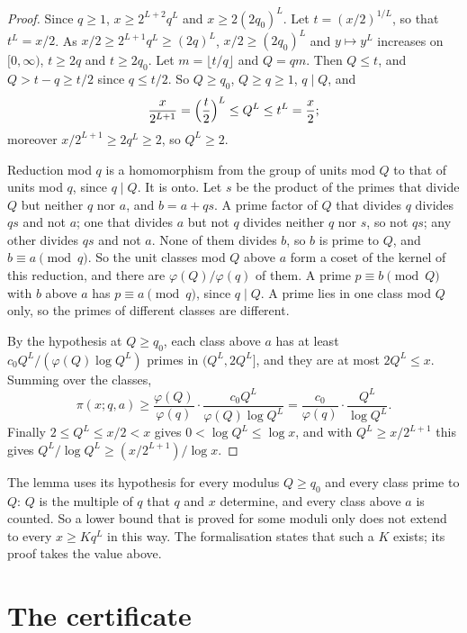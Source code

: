 \documentclass[11pt]{article}
\theoremstyle{definition}
\begin{document}
\begin{proof}
Since $q \ge 1$, $x \ge 2^{L + 2} q^L$ and $x \ge 2(2q_0)^L$. Let $t = (x/2)^{1/L}$, so that $t^L = x/2$. As $x/2
\ge 2^{L + 1} q^L \ge (2q)^L$, $x/2 \ge (2q_0)^L$ and $y \mapsto y^L$ increases on $[0, \infty)$, $t \ge 2q$ and $t
\ge 2q_0$. Let $m = \lfloor t/q \rfloor$ and $Q = qm$. Then $Q \le t$, and $Q > t - q \ge t/2$ since $q \le t/2$. So
$Q \ge q_0$, $Q \ge q \ge 1$, $q \mid Q$, and
\[
  \frac x{2^{L + 1}} = \Bigl(\frac t2\Bigr)^L \le Q^L \le t^L = \frac x2;
\]
moreover $x/2^{L + 1} \ge 2q^L \ge 2$, so $Q^L \ge 2$.

Reduction mod $q$ is a homomorphism from the group of units mod $Q$ to that of units mod $q$, since $q \mid Q$. It is
onto. Let $s$ be the product of the primes that divide $Q$ but neither $q$ nor $a$, and $b = a + qs$. A prime factor
of $Q$ that divides $q$ divides $qs$ and not $a$; one that divides $a$ but not $q$ divides neither $q$ nor $s$, so
not $qs$; any other divides $qs$ and not $a$. None of them divides $b$, so $b$ is prime to $Q$, and $b \equiv a
\pmod q$. So the unit classes mod $Q$ above $a$ form a coset of the kernel of this reduction, and there are
$\varphi(Q)/\varphi(q)$ of them. A prime $p \equiv b \pmod Q$ with $b$ above $a$ has $p \equiv a \pmod q$, since $q
\mid Q$. A prime lies in one class mod $Q$ only, so the primes of different classes are different.

By the hypothesis at $Q \ge q_0$, each class above $a$ has at least $c_0 Q^L/(\varphi(Q) \log Q^L)$ primes in $(Q^L,
2Q^L]$, and they are at most $2Q^L \le x$. Summing over the classes,
\[
  \pi(x; q, a) \ge \frac{\varphi(Q)}{\varphi(q)} \cdot \frac{c_0 Q^L}{\varphi(Q) \log Q^L}
  = \frac{c_0}{\varphi(q)} \cdot \frac{Q^L}{\log Q^L}.
\]
Finally $2 \le Q^L \le x/2 < x$ gives $0 < \log Q^L \le \log x$, and with $Q^L \ge x/2^{L + 1}$ this gives $Q^L/\log
Q^L \ge (x/2^{L + 1})/\log x$.
\end{proof}

The lemma uses its hypothesis for every modulus $Q \ge q_0$ and every class prime to $Q$: $Q$ is the multiple of $q$
that $q$ and $x$ determine, and every class above $a$ is counted. So a lower bound that is proved for some moduli
only does not extend to every $x \ge Kq^L$ in this way. The formalisation states that such a $K$ exists; its proof
takes the value above.

\section{The certificate}\label{sec:certificate}
\end{document}
